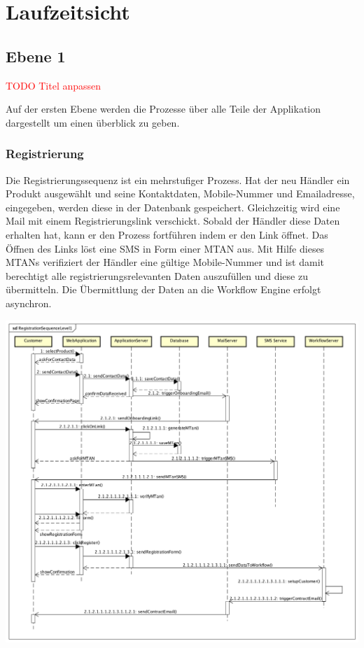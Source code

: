 \graphicspath{{./images/}}

\chapter{Laufzeitsicht}

\section{Ebene 1}
 \textcolor{red}{TODO Titel anpassen}
 
Auf der ersten Ebene werden die Prozesse über alle Teile  der Applikation dargestellt um einen überblick zu geben.

\subsection{Registrierung}

Die Registrierungssequenz ist ein mehrstufiger Prozess. Hat der neu Händler ein Produkt ausgewählt und seine Kontaktdaten, Mobile-Nummer und Emailadresse, eingegeben, werden diese in der Datenbank gespeichert. Gleichzeitig wird eine Mail mit einem Registrierungslink verschickt. Sobald der Händler diese Daten erhalten hat, kann er den Prozess fortführen indem er den Link öffnet. Das Öffnen des Links löst eine SMS in Form einer MTAN aus. Mit Hilfe dieses MTANs verifiziert der Händler eine gültige Mobile-Nummer und ist damit berechtigt alle registrierungsrelevanten Daten auszufüllen und diese zu übermitteln. Die Übermittlung der Daten an die Workflow Engine erfolgt asynchron.
\begin{center}
	\includegraphics[scale=0.44]{RegistrationSequenceLevel1.png}
\end{center}
\newpage

